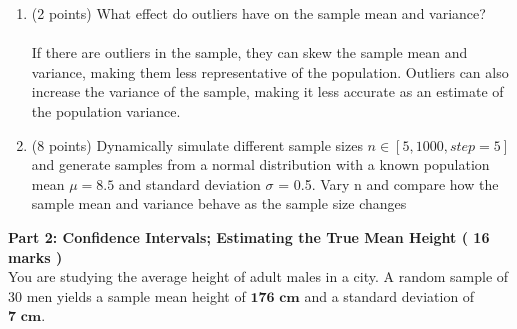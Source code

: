 \documentclass[a3paper,12pt]{extarticle} %
\begin{document}
\begin{enumerate}
        \item (2 points) What effect do outliers have on the sample mean and variance?
        \\ \\ If there are outliers in the sample, they can skew the sample mean and variance, making them less representative of the population. Outliers can also increase the variance of the sample, making it less accurate as an estimate of the population variance.
        \item (8 points) Dynamically simulate different sample sizes \(n \in [5, 1000, step=5]\) and generate samples
        from a normal distribution with a known population mean \(\mu = 8.5\) and standard deviation \(\sigma\) = 0.5.
        Vary n and compare how the sample mean and variance behave as the sample size changes
    \end{enumerate}
    \subitem \textbf{Part 2: Confidence Intervals; Estimating the True Mean Height ( 16  marks )}
    \\ You are studying the average height of adult males in a city. A random sample of 30 men yields a sample mean height of \(\textbf{176 cm}\) and a standard deviation of \(\textbf{7 cm}\). 
\end{document}
